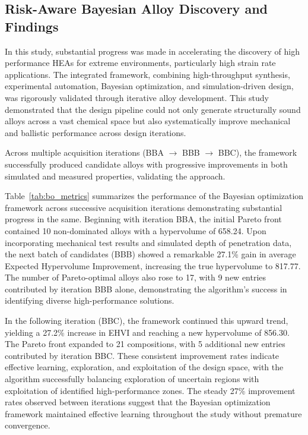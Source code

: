 \subsection{Risk-Aware Bayesian Alloy Discovery and Findings}


In this study, substantial progress was made in accelerating the discovery of high performance HEAs for extreme environments, particularly high strain rate applications. The integrated framework, combining high-throughput synthesis, experimental automation, Bayesian optimization, and simulation-driven design, was rigorously validated through iterative alloy development. This study demonstrated that the design pipeline could not only generate structurally sound alloys across a vast chemical space but also systematically improve mechanical and ballistic performance across design iterations.

Across multiple acquisition iterations (BBA $\rightarrow$ BBB $\rightarrow$ BBC), the framework successfully produced candidate alloys with progressive improvements in both simulated and measured properties, validating the approach.

Table~\ref{tab:bo_metrics} summarizes the performance of the Bayesian optimization framework across successive acquisition iterations demonstrating substantial progress in the same. Beginning with iteration BBA, the initial Pareto front contained 10 non-dominated alloys with a hypervolume of 658.24. Upon incorporating mechanical test results and simulated depth of penetration data, the next batch of candidates (BBB) showed a remarkable 27.1\% gain in average Expected Hypervolume Improvement, increasing the true hypervolume to 817.77. The number of Pareto-optimal alloys also rose to 17, with 9 new entries contributed by iteration BBB alone, demonstrating the algorithm's success in identifying diverse high-performance solutions.

In the following iteration (BBC), the framework continued this upward trend, yielding a 27.2\% increase in EHVI and reaching a new hypervolume of 856.30. The Pareto front expanded to 21 compositions, with 5 additional new entries contributed by iteration BBC. These consistent improvement rates indicate effective learning, exploration, and exploitation of the design space, with the algorithm successfully balancing exploration of uncertain regions with exploitation of identified high-performance zones. The steady 27\% improvement rates observed between iterations suggest that the Bayesian optimization framework maintained effective learning throughout the study without premature convergence.

